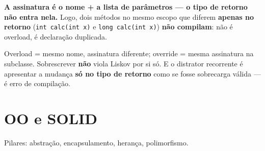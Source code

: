 \textbf{A assinatura é o nome + a lista de parâmetros --- o tipo de retorno
não entra nela.} Logo, dois métodos no mesmo escopo que diferem
\textbf{apenas no retorno} (\texttt{int calc(int x)} e
\texttt{long calc(int x)}) \textbf{não compilam}: não é overload, é
declaração duplicada.

\begin{pegadinha}
Overload = mesmo nome, assinatura diferente; override = mesma assinatura na
subclasse. Sobrescrever \textbf{não} viola Liskov por si só. E o distrator
recorrente é apresentar a mudança \textbf{só no tipo de retorno} como se
fosse sobrecarga válida --- é erro de compilação.
\end{pegadinha}

\section{OO e SOLID}

Pilares: abstração, encapsulamento, herança, polimorfismo.

